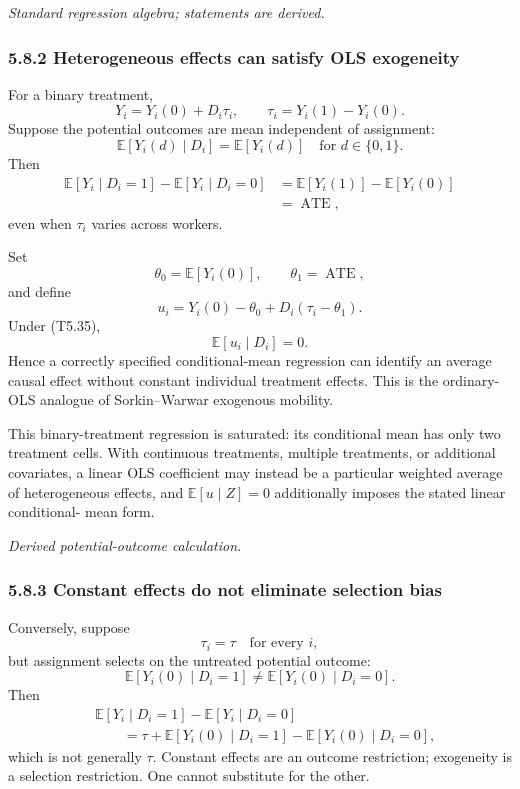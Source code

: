 \documentclass[11pt]{article}
\begin{document}
\textit{Standard regression algebra; statements are derived.}

\subsubsection{5.8.2 Heterogeneous effects can satisfy OLS exogeneity}

For a binary treatment,
\[
Y_i
=
Y_i(0)+D_i\tau_i,
\qquad
\tau_i=Y_i(1)-Y_i(0).
\tag{T5.34}
\]
Suppose the potential outcomes are mean independent of assignment:
\[
\mathbb E[Y_i(d)\mid D_i]
=
\mathbb E[Y_i(d)]
\quad
\text{for }d\in\{0,1\}.
\tag{T5.35}
\]
Then
\[
\begin{aligned}
\mathbb E[Y_i\mid D_i=1]
-\mathbb E[Y_i\mid D_i=0]
&=
\mathbb E[Y_i(1)]-\mathbb E[Y_i(0)]\\
&=
\operatorname{ATE},
\end{aligned}
\tag{T5.36}
\]
even when \(\tau_i\) varies across workers.

Set
\[
\theta_0=\mathbb E[Y_i(0)],
\qquad
\theta_1=\operatorname{ATE},
\tag{T5.37}
\]
and define
\[
u_i
=
Y_i(0)-\theta_0
+D_i(\tau_i-\theta_1).
\tag{T5.38}
\]
Under (T5.35),
\[
\mathbb E[u_i\mid D_i]=0.
\tag{T5.39}
\]
Hence a correctly specified conditional-mean regression can identify an
average causal effect without constant individual treatment effects.  This
is the ordinary-OLS analogue of Sorkin--Warwar exogenous mobility.

This binary-treatment regression is saturated: its conditional mean has
only two treatment cells.  With continuous treatments, multiple treatments,
or additional covariates, a linear OLS coefficient may instead be a
particular weighted average of heterogeneous effects, and
\(\mathbb E[u\mid Z]=0\) additionally imposes the stated linear conditional-
mean form.

\textit{Derived potential-outcome calculation.}

\subsubsection{5.8.3 Constant effects do not eliminate selection bias}

Conversely, suppose
\[
\tau_i=\tau
\quad\text{for every }i,
\tag{T5.40}
\]
but assignment selects on the untreated potential outcome:
\[
\mathbb E[Y_i(0)\mid D_i=1]
\neq
\mathbb E[Y_i(0)\mid D_i=0].
\tag{T5.41}
\]
Then
\[
\begin{aligned}
&\mathbb E[Y_i\mid D_i=1]
-\mathbb E[Y_i\mid D_i=0]\\
&\qquad =
\tau
+\mathbb E[Y_i(0)\mid D_i=1]
-\mathbb E[Y_i(0)\mid D_i=0],
\end{aligned}
\tag{T5.42}
\]
which is not generally \(\tau\).  Constant effects are an outcome
restriction; exogeneity is a selection restriction.  One cannot substitute
for the other.
\end{document}
